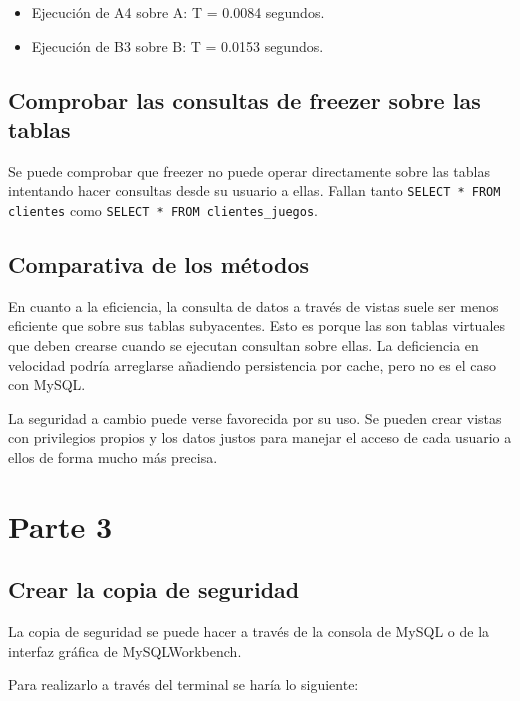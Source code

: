 \documentclass[a4paper, 11pt, oneside]{article} %
\begin{document}
\begin{itemize}
	\item Ejecución de A4 sobre A: T = 0.0084 segundos.
	\item Ejecución de B3 sobre B: T = 0.0153 segundos.
\end{itemize}

\subsection{Comprobar las consultas de freezer sobre las tablas}

Se puede comprobar que freezer no puede operar directamente sobre las tablas intentando hacer consultas desde su usuario a ellas. Fallan tanto \texttt{SELECT * FROM clientes} como \texttt{SELECT * FROM clientes_juegos}.

\subsection{Comparativa de los métodos}

En cuanto a la eficiencia, la consulta de datos a través de vistas suele ser menos eficiente que sobre sus tablas subyacentes. Esto es porque las son tablas virtuales que deben crearse cuando se ejecutan consultan sobre ellas. La deficiencia en velocidad podría arreglarse añadiendo persistencia por cache, pero no es el caso con MySQL.

La seguridad a cambio puede verse favorecida por su uso. Se pueden crear vistas con privilegios propios y los datos justos para manejar el acceso de cada usuario a ellos de forma mucho más precisa.


\section{Parte 3}

\subsection{Crear la copia de seguridad}

La copia de seguridad se puede hacer a través de la consola de MySQL o de la interfaz gráfica de MySQLWorkbench.

Para realizarlo a través del terminal se haría lo siguiente:
\end{document}
